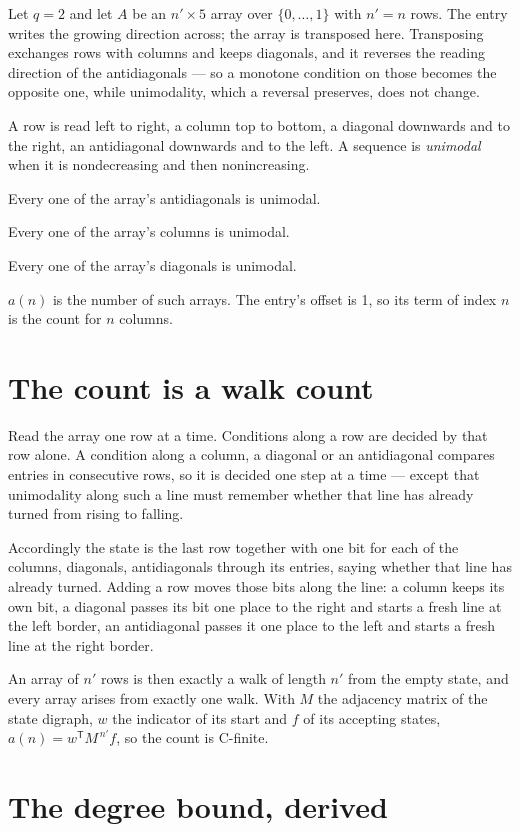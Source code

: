 \documentclass[11pt]{article}
\theoremstyle{definition}
\begin{document}
Let $q = 2$ and let $A$ be an $n' \times 5$ array over $\{0,\dots,1\}$ with $n' = n$ rows. The entry writes the growing direction across; the array is transposed here. Transposing exchanges rows with columns and keeps diagonals, and it reverses the reading direction of the antidiagonals --- so a monotone condition on those becomes the opposite one, while unimodality, which a reversal preserves, does not change.

A row is read left to right, a column top to bottom, a diagonal downwards and to the right, an antidiagonal downwards and to the left. A sequence is {\itshape unimodal} when it is nondecreasing and then nonincreasing.

Every one of the array's antidiagonals is unimodal.

Every one of the array's columns is unimodal.

Every one of the array's diagonals is unimodal.

$a(n)$ is the number of such arrays. The entry's offset is 1, so its term of index $n$ is the count for $n$ columns.

\section{The count is a walk count}

Read the array one row at a time. Conditions along a row are decided by that row alone. A condition along a column, a diagonal or an antidiagonal compares entries in consecutive rows, so it is decided one step at a time --- except that unimodality along such a line must remember whether that line has already turned from rising to falling.

Accordingly the state is the last row together with one bit for each of the columns, diagonals, antidiagonals through its entries, saying whether that line has already turned. Adding a row moves those bits along the line: a column keeps its own bit, a diagonal passes its bit one place to the right and starts a fresh line at the left border, an antidiagonal passes it one place to the left and starts a fresh line at the right border.

An array of $n'$ rows is then exactly a walk of length $n'$ from the empty state, and every array arises from exactly one walk. With $M$ the adjacency matrix of the state digraph, $w$ the indicator of its start and $f$ of its accepting states, $a(n) = w^{\mathsf T}M^{\,n'}f$, so the count is C-finite.

\section{The degree bound, derived}
\end{document}
